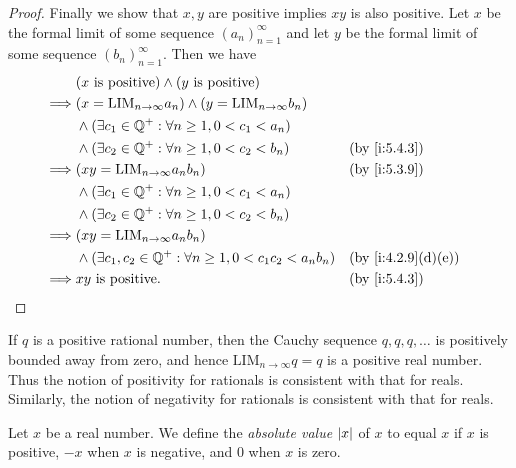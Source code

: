 \begin{proof}
  Finally we show that \(x, y\) are positive implies \(xy\) is also positive.
  Let \(x\) be the formal limit of some sequence \((a_n)_{n = 1}^{\infty}\) and let \(y\) be the formal limit of some sequence \((b_n)_{n = 1}^{\infty}\).
  Then we have
  \begin{align*}
             & (x \text{ is positive}) \land (y \text{ is positive})                                                \\
    \implies & (x = \text{LIM}_{n \to \infty} a_n) \land (y = \text{LIM}_{n \to \infty} b_n)                        \\
             & \land (\exists c_1 \in \Q^+ : \forall n \geq 1, 0 < c_1 < a_n)                                       \\
             & \land (\exists c_2 \in \Q^+ : \forall n \geq 1, 0 < c_2 < b_n)                &  & \by{i:5.4.3}      \\
    \implies & (xy = \text{LIM}_{n \to \infty} a_n b_n)                                      &  & \by{i:5.3.9}      \\
             & \land (\exists c_1 \in \Q^+ : \forall n \geq 1, 0 < c_1 < a_n)                                       \\
             & \land (\exists c_2 \in \Q^+ : \forall n \geq 1, 0 < c_2 < b_n)                                       \\
    \implies & (xy = \text{LIM}_{n \to \infty} a_n b_n)                                                             \\
             & \land (\exists c_1, c_2 \in \Q^+ : \forall n \geq 1, 0 < c_1 c_2 < a_n b_n)   &  & \by{i:4.2.9}[d,e] \\
    \implies & xy \text{ is positive}.                                                       &  & \by{i:5.4.3}
  \end{align*}
\end{proof}

\begin{note}
  If \(q\) is a positive rational number, then the Cauchy sequence \(q, q, q, \dots\) is positively bounded away from zero, and hence \(\text{LIM}_{n \to \infty} q = q\) is a positive real number.
  Thus the notion of positivity for rationals is consistent with that for reals.
  Similarly, the notion of negativity for rationals is consistent with that for reals.
\end{note}

\begin{defn}\label{i:5.4.5}
  Let \(x\) be a real number.
  We define the \emph{absolute value} \(\left\lvert x\right\rvert\) of \(x\) to equal \(x\) if \(x\) is positive, \(-x\) when \(x\) is negative, and \(0\) when \(x\) is zero.
\end{defn}

